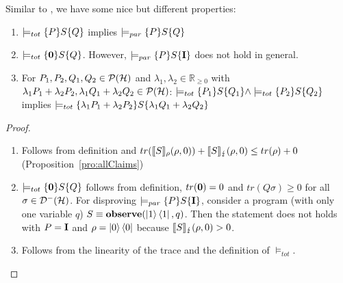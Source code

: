 \documentclass[a4paper,UKenglish,cleveref, autoref, thm-restate]{lipics-v2021}
\begin{document}
Similar to \cite{floydHoareLogic}, we have some nice but different properties:
\begin{proposition}
    \begin{enumerate}
        \item $\models_{tot} \{P\} S \{Q\}$ implies $\models_{par} \{P\} S \{Q\}$
        \item $\models_{tot} \{\mathbf{0}\} S \{Q\}$. However, $\models_{par} \{P\} S \{\textbf{I}\}$ does not hold in general.
        \item For $P_1,P_2,Q_1,Q_2 \in \mathcal{P}(\mathcal{H})$ and $\lambda_1, \lambda_2 \in \mathbb{R}_{\geq 0}$ with $\lambda_1 P_1 + \lambda_2 P_2, \lambda_1 Q_1 + \lambda_2 Q_2 \in \mathcal{P}(\mathcal{H}) $:
        $\models_{tot} \{P_1\} S \{Q_1\} \land \models_{tot} \{P_2\} S \{Q_2\}$ implies $\models_{tot} \{\lambda_1 P_1 + \lambda_2 P_2\} S \{\lambda_1 Q_1 + \lambda_2 Q_2\} $
    \end{enumerate}
\end{proposition}
\begin{proof}
    \begin{enumerate}
        \item Follows from definition and $tr(\llbracket S \rrbracket_{\rho} (\rho,0))+ \llbracket S \rrbracket_{\lightning} (\rho,0)\leq tr(\rho)+0$ (Proposition~\ref{pro:allClaims})
        \item $\models_{tot} \{\mathbf{0}\} S \{Q\}$ follows from definition, $ tr(\mathbf{0})=0$ and $tr(Q\sigma)\geq 0$ for all $\sigma\in \mathcal{D}^- (\mathcal{H})$. For disproving $\models_{par} \{P\} S \{\textbf{I}\}$, consider a program (with only one variable $q$) $S \equiv \mathbf{observe }(\ket{1}\bra{1}, q)$. Then the statement does not holds with $P=\textbf{I}$ and $\rho = \ket{0}\bra{0}$ because $\llbracket S \rrbracket_{\lightning}(\rho,0) > 0$.
        \item Follows from the linearity of the trace and the definition of $\models_{tot}$.
    \end{enumerate}
\end{proof}
\end{document}
